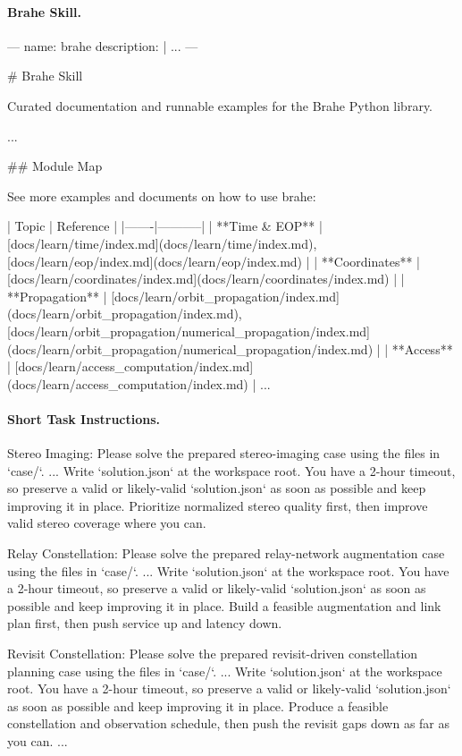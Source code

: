 \documentclass[11pt]{article}
\newenvironment{promptblockcompact}
  {\VerbatimEnvironment\par\smallskip\Needspace{6\baselineskip}\noindent\begin{promptblockinnercompact}}
  {\end{promptblockinnercompact}\par\smallskip}
\newcommand{\promptheadingcompact}[1]{\Needspace{4\baselineskip}\paragraph{#1}\mbox{}\par}
\begin{document}
\promptheadingcompact{Brahe Skill.}
\begin{promptblockcompact}
---
name: brahe
description: |
  ...
---

# Brahe Skill

Curated documentation and runnable examples for the Brahe Python library.

...

## Module Map

See more examples and documents on how to use brahe:

| Topic | Reference |
|-------|-----------|
| **Time & EOP** | [docs/learn/time/index.md](docs/learn/time/index.md),
  [docs/learn/eop/index.md](docs/learn/eop/index.md) |
| **Coordinates** | [docs/learn/coordinates/index.md](docs/learn/coordinates/index.md) |
| **Propagation** | [docs/learn/orbit_propagation/index.md](docs/learn/orbit_propagation/index.md),
  [docs/learn/orbit_propagation/numerical_propagation/index.md](docs/learn/orbit_propagation/numerical_propagation/index.md) |
| **Access** | [docs/learn/access_computation/index.md](docs/learn/access_computation/index.md) |
...
\end{promptblockcompact}

\promptheadingcompact{Short Task Instructions.}
\begin{promptblockcompact}
Stereo Imaging:
Please solve the prepared stereo-imaging case using the files in `case/`.
...
Write `solution.json` at the workspace root. You have a 2-hour timeout, so
preserve a valid or likely-valid `solution.json` as soon as possible and keep
improving it in place. Prioritize normalized stereo quality first, then
improve valid stereo coverage where you can.

Relay Constellation:
Please solve the prepared relay-network augmentation case using the files in
`case/`.
...
Write `solution.json` at the workspace root. You have a 2-hour timeout, so
preserve a valid or likely-valid `solution.json` as soon as possible and keep
improving it in place. Build a feasible augmentation and link plan first, then
push service up and latency down.

Revisit Constellation:
Please solve the prepared revisit-driven constellation planning case using the
files in `case/`.
...
Write `solution.json` at the workspace root. You have a 2-hour timeout, so
preserve a valid or likely-valid `solution.json` as soon as possible and keep
improving it in place. Produce a feasible constellation and observation
schedule, then push the revisit gaps down as far as you can.
...
\end{promptblockcompact}
\end{document}
